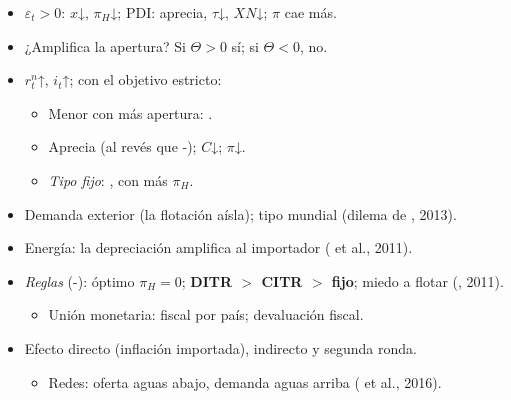 \documentclass{article}
\begin{document}
\begin{columnas}
\begin{itemize}
\item $\varepsilon_t>0$: $x$↓, $\pi_H$↓; PDI: aprecia, $\tau$↓, $XN$↓; $\pi$ cae más.
\item ¿Amplifica la apertura? Si $\Theta>0$ sí; si $\Theta<0$, no.
\end{itemize}
\begin{itemize}
\item $r^n_t$↑, $i_t$↑; con el objetivo estricto:
  \begin{itemize}
  \item Menor con más apertura: .
  \item Aprecia (al revés que -); $C$↓; $\pi$↓.
  \item \emph{Tipo fijo}: , con más $\pi_H$.
  \end{itemize}
\end{itemize}
\begin{itemize}
\item Demanda exterior (la flotación aísla); tipo mundial (dilema de , 2013).
\item Energía: la depreciación amplifica al importador ( et al., 2011).
\item \emph{Reglas} (-): óptimo $\pi_H=0$; \textbf{DITR $>$ CITR $>$ fijo}; miedo a flotar (, 2011).
  \begin{itemize}
  \item Unión monetaria: fiscal por país; devaluación fiscal.
  \end{itemize}
\end{itemize}
\begin{itemize}
\item Efecto directo (inflación importada), indirecto y segunda ronda.
  \begin{itemize}
  \item Redes: oferta aguas abajo, demanda aguas arriba ( et al., 2016).

\end{itemize}
\end{itemize}
\end{columnas}
\end{document}
